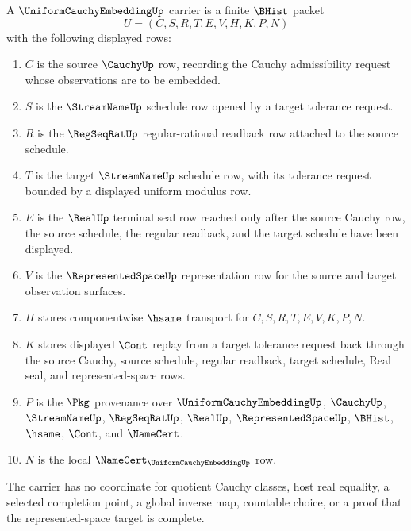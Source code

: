 \begin{definition}
\label{def:uniform-cauchy-embedding-carrier}
A $\UniformCauchyEmbeddingUp$ carrier is a finite $\BHist$ packet
$$
U=(C,S,R,T,E,V,H,K,P,N)
$$
with the following displayed rows:
\begin{enumerate}
\item $C$ is the source $\CauchyUp$ row, recording the Cauchy admissibility request whose observations are to be embedded.
\item $S$ is the $\StreamNameUp$ schedule row opened by a target tolerance request.
\item $R$ is the $\RegSeqRatUp$ regular-rational readback row attached to the source schedule.
\item $T$ is the target $\StreamNameUp$ schedule row, with its tolerance request bounded by a displayed uniform modulus row.
\item $E$ is the $\RealUp$ terminal seal row reached only after the source Cauchy row, the source schedule, the regular readback, and the target schedule have been displayed.
\item $V$ is the $\RepresentedSpaceUp$ representation row for the source and target observation surfaces.
\item $H$ stores componentwise $\hsame$ transport for $C,S,R,T,E,V,K,P,N$.
\item $K$ stores displayed $\Cont$ replay from a target tolerance request back through the source Cauchy, source schedule, regular readback, target schedule, Real seal, and represented-space rows.
\item $P$ is the $\Pkg$ provenance over $\UniformCauchyEmbeddingUp$, $\CauchyUp$, $\StreamNameUp$, $\RegSeqRatUp$, $\RealUp$, $\RepresentedSpaceUp$, $\BHist$, $\hsame$, $\Cont$, and $\NameCert$.
\item $N$ is the local $\NameCert_{\UniformCauchyEmbeddingUp}$ row.
\end{enumerate}
The carrier has no coordinate for quotient Cauchy classes, host real equality, a selected completion point, a global inverse map, countable choice, or a proof that the represented-space target is complete.
\end{definition}

